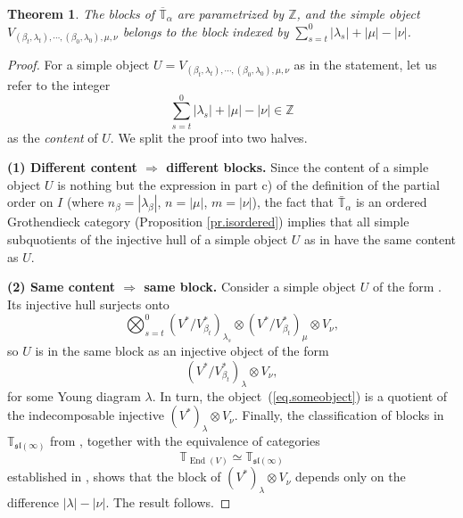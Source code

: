 \documentclass[11pt]{article}
\theoremstyle{plain}
\newtheorem{theorem}[lemma]{Theorem}
\theoremstyle{nonumberplain}
\theoremstyle{plain}
\theoremstyle{nonumberplain}
\newtheorem{proof}{Proof}
\newcommand\bT{\mathbb T}
\newcommand\bZ{\mathbb Z}
\newcommand\fsl{\mathfrak{sl}}
\DeclareMathOperator{\End}{\mathrm{End}}
\begin{document}
\begin{theorem}\label{th.blocks}
  The blocks of $\overline{\bT}_\alpha$ are parametrized
  by $\bZ$, and the simple object 
    {$V_{(\beta_t,\lambda_t),\cdots,(\beta_0,\lambda_0),\mu,\nu}$}
  belongs to the block indexed by $\sum\limits_{s=t}^0|\lambda_s|+|\mu|-|\nu|$.
\end{theorem}
\begin{proof}
For a simple object $
  U=V_{(\beta_t,\lambda_t),\cdots,(\beta_0,\lambda_0),\mu,\nu}
$
as in the statement, let us refer to the integer 
\begin{equation*}
  \sum\limits_{s=t}^0|\lambda_s|+|\mu|-|\nu|\in \bZ
\end{equation*}
as the {\it content} of $U$. We split the proof into two halves. 


\vspace{.5cm}



{\bf (1) Different content $\Rightarrow$ different blocks.} Since the content of a simple object $U$ is nothing but the expression in part c) of the definition of the partial order on $I$ (where $n_\beta=\left|\lambda_\beta\right|$, $n=|\mu|$, $m=|\nu|$), the fact that $\bar{\bT}_\alpha$ is an ordered Grothendieck category (Proposition \ref{pr.isordered}) implies that 
all
simple subquotients of the injective hull  of a
simple object $U$ as in  have the same content as $U$.


\vspace{.5cm}


{\bf (2) Same content $\Rightarrow$ same block.} Consider a simple
object $U$ of the form . Its injective hull
 surjects onto
\begin{equation*}
  \bigotimes_{s=t}^0 (V^*/V^*_{\beta_t})_{\lambda_s} \otimes (V^*/V^*_{\beta_t})_{\mu}\otimes V_\nu,
\end{equation*}
so $U$ is in the same block as an injective object of the form
\begin{equation}
  (V^*/V^*_{\beta_t})_{\lambda}\otimes V_\nu,
  \label{eq.someobject}
\end{equation}
for some Young diagram $\lambda$.  In turn, the
object~(\ref{eq.someobject}) is a quotient of the indecomposable
injective $\left(V^*\right)_\lambda\otimes V_\nu$. 
Finally, the classification of blocks in $\bT_{\fsl(\infty)}$ from \cite[Corollary 6.6]{DPS}, together with the equivalence of categories $$\bT_{\End(V)}\simeq \bT_{\fsl(\infty)}$$ established in \cite{PS2}, shows that the block of $\left(V^*\right)_\lambda \otimes V_\nu$ depends only on the difference $|\lambda|-|\nu|$.  The result follows.
\end{proof}
\end{document}
